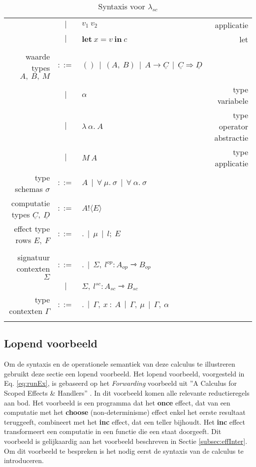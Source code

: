\begin{table}
\begin{tabular}{|r c l r|}
          & $|$ & $v_{1} \: v_{2}$ & applicatie \\
          & $|$ & $\textbf{let} \: x = v \: \textbf{in} \: c$ & let \\
         & & & \\
         waarde types $A, \: B, \: M$ & $::=$ & $() \: \: | \: \: (A, \:B) \: \: | \: \: A \rightarrow \underline{C} \: \: | \: \: \underline{C} \Rightarrow \underline{D}$ & \\
         & $|$ & $\alpha$ & type variabele \\
         & $|$ & $\lambda \: \alpha . \: A$ & type operator abstractie \\
         & $|$ & $M \: A$ & type applicatie \\
         type schemas $\sigma$ & $::=$ & $A \: \: | \: \: \forall \: \mu . \: \sigma \: \: | \: \: \forall \: \alpha. \: \sigma $ & \\
         computatie types $\underline{C}, \: \underline{D}$ & $::=$ & $A ! \langle E \rangle $ & \\
         effect type rows $E, \: F$ & $::=$ & $. \: \: | \: \: \mu \: \: | \: \: l; \: E $ & \\
         & & & \\
     signatuur contexten $\Sigma$ & $::=$ & $. \ \ | \ \ \Sigma , \ l^{op} : A_{op} \rightarrowtriangle B_{op}$ & \\
     & $|$ & $\Sigma , \ l^{sc} : A_{sc} \rightarrowtriangle B_{sc}$ & \\
         type contexten $\Gamma$ & $::=$ & $. \: \: | \:\: \Gamma, \: x \: : \: A \: \: | \: \: \Gamma , \: \mu \: \: | \: \: \Gamma, \: \alpha $ & \\
         & & & \\
    \hline
    \end{tabular}
    \caption{Syntaxis voor $\lambda_{sc}$}
    \label{fig:syntaxisScoped}
\end{table}

\subsection{Lopend voorbeeld}
Om de syntaxis en de operationele semantiek van deze calculus te illustreren gebruikt deze sectie een lopend voorbeeld. 
Het lopend voorbeeld, voorgesteld in Eq. \ref{eq:runEx}, is gebaseerd op het \emph{Forwarding} voorbeeld uit ''A Calculus for Scoped Effects \& Handlers'' \cite{Bosman2022}. In dit voorbeeld komen alle relevante reductieregels aan bod. Het voorbeeld is een programma dat het \textbf{once} effect, dat van een computatie met het \textbf{choose} (non-determinisme) effect enkel het eerste resultaat teruggeeft, combineert met het \textbf{inc} effect, dat een teller bijhoudt. Het \textbf{inc} effect transformeert een computatie in een functie die een staat doorgeeft. Dit voorbeeld is gelijkaardig aan het voorbeeld beschreven in Sectie \ref{subsec:effInter}. Om dit voorbeeld te bespreken is het nodig eerst de syntaxis van de calculus te introduceren.

